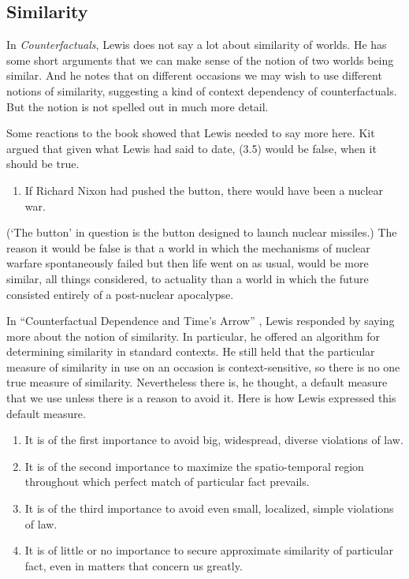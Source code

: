 \subsection{Similarity} 
In \textit{Counterfactuals}, Lewis does not say a lot about similarity of worlds. He has some short arguments that we can make sense of the notion of two worlds being similar. And he notes that on different occasions we may wish to use different notions of similarity, suggesting a kind of context dependency of counterfactuals. But the notion is not spelled out in much more detail.

Some reactions to the book showed that Lewis needed to say more here. Kit \citet{Fine1975b} argued that given what Lewis had said to date, (3.5) would be false, when it should be true.

\begin{enumerate}
\renewcommand{\labelenumi}{(3.\arabic{enumi})}
\setcounter{enumi}{4}
\item If Richard Nixon had pushed the button, there would have been a nuclear war.
\end{enumerate}

\noindent (`The button' in question is the button designed to launch nuclear missiles.) The reason it would be false is that a world in which the mechanisms of nuclear warfare spontaneously failed but then life went on as usual, would be more similar, all things considered, to actuality than a world in which the future consisted entirely of a post-nuclear apocalypse.

In ``Counterfactual Dependence and Time's Arrow'' \citeyearpar{Lewis1979c}, Lewis responded by saying more about the notion of similarity. In particular, he offered an algorithm for determining similarity in standard contexts. He still held that the particular measure of similarity in use on an occasion is context-sensitive, so there is no one true measure of similarity. Nevertheless there is, he thought, a default measure that we use unless there is a reason to avoid it. Here is how Lewis expressed this default measure.

\begin{enumerate} 
\item It is of the first importance to avoid big, widespread, diverse violations of law.
\item It is of the second importance to maximize the spatio-temporal region throughout which perfect match of particular fact prevails.
\item It is of the third importance to avoid even small, localized, simple violations of law.
\item It is of little or no importance to secure approximate similarity of particular fact, even in matters that concern us greatly. \citeyearpar[47-48]{Lewis1979c}
\end{enumerate}

